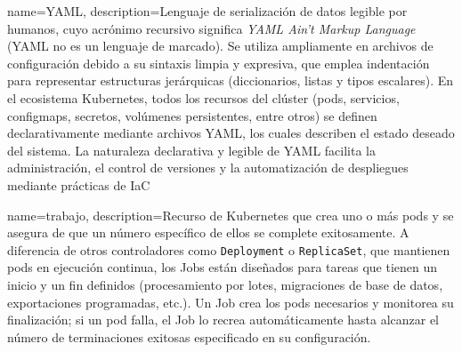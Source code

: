 {
    name={YAML},
    description={Lenguaje de serialización de datos legible por humanos, cuyo acrónimo recursivo significa \textit{YAML Ain't Markup Language} (YAML no es un lenguaje de marcado). Se utiliza ampliamente en archivos de configuración debido a su sintaxis limpia y expresiva, que emplea indentación para representar estructuras jerárquicas (diccionarios, listas y tipos escalares). En el ecosistema Kubernetes, todos los recursos del clúster (pods, servicios, configmaps, secretos, volúmenes persistentes, entre otros) se definen declarativamente mediante archivos YAML, los cuales describen el estado deseado del sistema. La naturaleza declarativa y legible de YAML facilita la administración, el control de versiones y la automatización de despliegues mediante prácticas de \ac{IaC} \citep{yaml2025spec, kubernetes2025yaml}}
}

{
    name={trabajo},
    description={Recurso de Kubernetes que crea uno o más pods y se asegura de que un número específico de ellos se complete exitosamente. A diferencia de otros controladores como \texttt{Deployment} o \texttt{ReplicaSet}, que mantienen pods en ejecución continua, los Jobs están diseñados para tareas que tienen un inicio y un fin definidos (procesamiento por lotes, migraciones de base de datos, exportaciones programadas, etc.). Un Job crea los pods necesarios y monitorea su finalización; si un pod falla, el Job lo recrea automáticamente hasta alcanzar el número de terminaciones exitosas especificado en su configuración. \citep{kubernetes2025jobs}}
}
